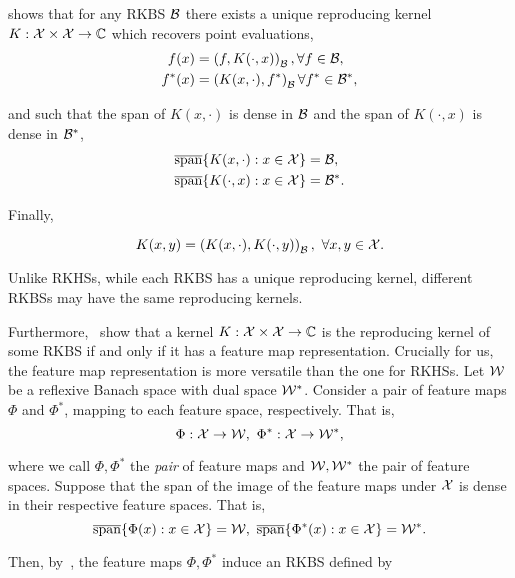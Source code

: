 \parencite[Theorem 2]{zhangReproducingKernel2009} shows that for any RKBS ${\mathcal{B}}$ there exists a unique reproducing kernel $K: {\mathcal{X}} \times {\mathcal{X}} \to {\mathbb{C}}$ which recovers point evaluations,
\begin{align}
    f(x) &= \left(f, K(\cdot, x)\right)_{\mathcal{B}}, \forall f \in {\mathcal{B}}, \\
    f^*(x) &= \left(K(x, \cdot), f^*\right)_{\mathcal{B}} \forall f^* \in {\mathcal{B}}^*,
\end{align}

and such that the span of $K(x, \cdot)$ is dense in ${\mathcal{B}}$ and the span of $K(\cdot, x)$ is dense in ${\mathcal{B}}^*$,
\begin{align}
    \overline{\text{span}}\{K(x, \cdot): x \in {\mathcal{X}}\} &= {\mathcal{B}}, \\
    \overline{\text{span}}\{K(\cdot, x): x \in {\mathcal{X}}\} &= {\mathcal{B}}^*.
\end{align}

Finally,

\begin{equation}
    K(x, y) = \left(K(x, \cdot), K(\cdot, y)\right)_{\mathcal{B}}, \ \forall x, y \in {\mathcal{X}}.
\end{equation}

Unlike RKHSs, while each RKBS has a unique reproducing kernel, different RKBSs may have the same reproducing kernels.

Furthermore,~\parencite[Theorems 3 and 4]{zhangReproducingKernel2009} show that a kernel $K: {\mathcal{X}} \times {\mathcal{X}} \to {\mathbb{C}}$ is the reproducing kernel of some RKBS if and only if it has a feature map representation. Crucially for us, the feature map representation is more versatile than the one for RKHSs. Let ${\mathcal{W}}$ be a reflexive Banach space with dual space ${\mathcal{W}}^*$. Consider a pair of feature maps $\Phi$ and $\Phi^*$, mapping to each feature space, respectively. That is,
\begin{equation*}
    \Phi: {\mathcal{X}} \to {\mathcal{W}}, \ \Phi^*: {\mathcal{X}} \to {\mathcal{W}}^*,
\end{equation*}

\noindent where we call $\Phi, \Phi^*$ the \textit{pair} of feature maps and ${\mathcal{W}}, {\mathcal{W}}^*$ the pair of feature spaces. Suppose that the span of the image of the feature maps under ${\mathcal{X}}$ is dense in their respective feature spaces. That is,
\begin{equation}
    \overline{\text{span}}\{\Phi(x): x \in {\mathcal{X}}\} = {\mathcal{W}}, \ \overline{\text{span}}\{\Phi^*(x): x \in {\mathcal{X}}\} = {\mathcal{W}}^*.
\end{equation}

Then, by~\parencite[Theorem 3]{zhangReproducingKernel2009}, the feature maps $\Phi, \Phi^*$ induce an RKBS defined by


